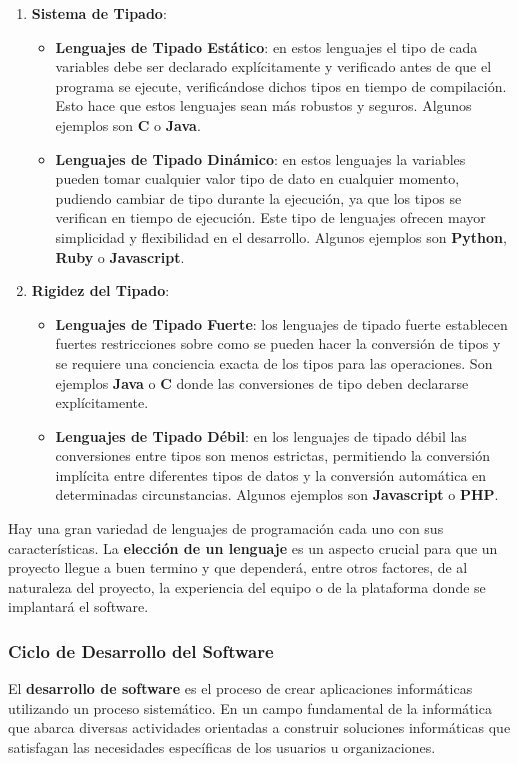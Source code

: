 \begin{enumerate}
		\item \textbf{Sistema de Tipado}:
		\begin{itemize}
			\item \textbf{Lenguajes de Tipado Estático}: en estos lenguajes el tipo de cada variables debe ser declarado explícitamente y verificado antes de que el programa se ejecute, verificándose dichos tipos en tiempo de compilación. Esto hace que estos lenguajes sean más robustos y seguros. Algunos ejemplos son \textbf{C} o \textbf{Java}.
			\item \textbf{Lenguajes de Tipado Dinámico}: en estos lenguajes la variables pueden tomar cualquier valor tipo de dato en cualquier momento, pudiendo cambiar de tipo durante la ejecución, ya que los tipos se verifican en tiempo de ejecución. Este tipo de lenguajes ofrecen mayor simplicidad y flexibilidad en el desarrollo. Algunos ejemplos son \textbf{Python}, \textbf{Ruby} o \textbf{Javascript}.
		\end{itemize}
		
		\item \textbf{Rigidez del Tipado}: 
		\begin{itemize}
			\item \textbf{Lenguajes de Tipado Fuerte}: los lenguajes de tipado fuerte establecen fuertes restricciones sobre como se pueden hacer la conversión de tipos y se requiere una conciencia exacta de los tipos para las operaciones. Son ejemplos \textbf{Java} o \textbf{C} donde las conversiones de tipo deben declararse explícitamente.
			\item \textbf{Lenguajes de Tipado Débil}: en los lenguajes de tipado débil las conversiones entre tipos son menos estrictas, permitiendo la conversión implícita entre diferentes tipos de datos y la conversión automática en determinadas circunstancias. Algunos ejemplos son \textbf{Javascript} o \textbf{PHP}.
		\end{itemize}
\end{enumerate}

Hay una gran variedad de lenguajes de programación cada uno con sus características. La \textbf{elección de un lenguaje} es un aspecto crucial para que un proyecto llegue a buen termino y que dependerá, entre otros factores, de al naturaleza del proyecto, la experiencia del equipo o de la plataforma donde se implantará el software.

\subsubsection{Ciclo de Desarrollo del Software}
El \textbf{desarrollo de software} es el proceso de crear aplicaciones informáticas utilizando un proceso sistemático. En un campo fundamental de la informática que abarca diversas actividades orientadas a construir soluciones informáticas que satisfagan las necesidades específicas de los usuarios u organizaciones. 

